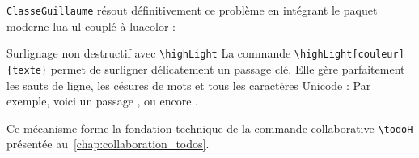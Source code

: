 \texttt{ClasseGuillaume} résout définitivement ce problème en intégrant le paquet moderne \textsf{lua-ul} couplé à \textsf{luacolor} :
\begin{boiteSynthese}{Surlignage non destructif avec \texttt{\textbackslash highLight}}
  La commande \texttt{\textbackslash highLight[couleur]\{texte\}} permet de surligner délicatement un passage clé.
  Elle gère parfaitement les sauts de ligne, les césures de mots et tous les caractères Unicode :
  Par exemple, voici un passage , ou encore .
\end{boiteSynthese}
Ce mécanisme forme la fondation technique de la commande collaborative \texttt{\textbackslash todoH} présentée au~\cref{chap:collaboration_todos}.

